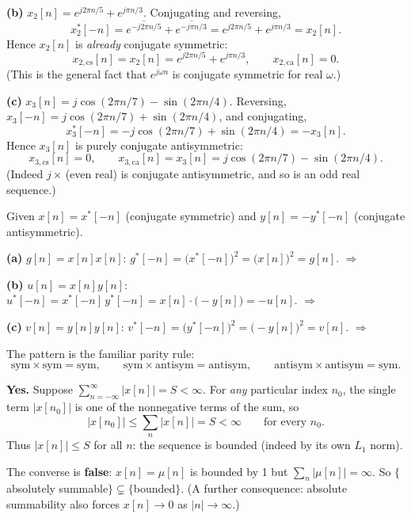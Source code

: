 \textbf{(b)} $x_2[n]=e^{j2\pi n/5}+e^{j\pi n/3}$. Conjugating and reversing,
\[
x_2^*[-n]=\overline{e^{-j2\pi n/5}}+\overline{e^{-j\pi n/3}}=e^{j2\pi n/5}+e^{j\pi n/3}=x_2[n].
\]
Hence $x_2[n]$ is \emph{already} conjugate symmetric:
\[
\boxed{\;x_{2,\mathrm{cs}}[n]=x_2[n]=e^{j2\pi n/5}+e^{j\pi n/3},\qquad x_{2,\mathrm{ca}}[n]=0.\;}
\]
(This is the general fact that $e^{j\omega n}$ is conjugate symmetric for real $\omega$.)

\textbf{(c)} $x_3[n]=j\cos(2\pi n/7)-\sin(2\pi n/4)$. Reversing,
$x_3[-n]=j\cos(2\pi n/7)+\sin(2\pi n/4)$, and conjugating,
\[
x_3^*[-n]=-j\cos(2\pi n/7)+\sin(2\pi n/4)=-x_3[n].
\]
Hence $x_3[n]$ is purely conjugate antisymmetric:
\[
\boxed{\;x_{3,\mathrm{cs}}[n]=0,\qquad x_{3,\mathrm{ca}}[n]=x_3[n]=j\cos(2\pi n/7)-\sin(2\pi n/4).\;}
\]
(Indeed $j\times$\,(even real) is conjugate antisymmetric, and so is an odd real sequence.)


Given $x[n]=x^*[-n]$ (conjugate symmetric) and $y[n]=-y^*[-n]$ (conjugate antisymmetric).

\textbf{(a)} $g[n]=x[n]x[n]$:
$g^*[-n]=\bigl(x^*[-n]\bigr)^2=\bigl(x[n]\bigr)^2=g[n]$.
$\Rightarrow$ 

\textbf{(b)} $u[n]=x[n]y[n]$:
$u^*[-n]=x^*[-n]\,y^*[-n]=x[n]\cdot\bigl(-y[n]\bigr)=-u[n]$.
$\Rightarrow$ 

\textbf{(c)} $v[n]=y[n]y[n]$:
$v^*[-n]=\bigl(y^*[-n]\bigr)^2=\bigl(-y[n]\bigr)^2=v[n]$.
$\Rightarrow$ 

The pattern is the familiar parity rule:
\[
\text{sym}\times\text{sym}=\text{sym},\qquad
\text{sym}\times\text{antisym}=\text{antisym},\qquad
\text{antisym}\times\text{antisym}=\text{sym}.
\]


\textbf{Yes.} Suppose $\sum_{n=-\infty}^{\infty}|x[n]|=S<\infty$. For \emph{any} particular
index $n_0$, the single term $|x[n_0]|$ is one of the nonnegative terms of the sum, so
\[
|x[n_0]|\le\sum_{n}|x[n]|=S<\infty\qquad\text{for every }n_0 .
\]
Thus $|x[n]|\le S$ for all $n$: the sequence is bounded (indeed by its own $L_1$ norm).

The converse is \textbf{false}: $x[n]=\mu[n]$ is bounded by 1 but
$\sum_n|\mu[n]|=\infty$. So $\{$absolutely summable$\}\subsetneq\{$bounded$\}$.
(A further consequence: absolute summability also forces $x[n]\to 0$ as $|n|\to\infty$.)

